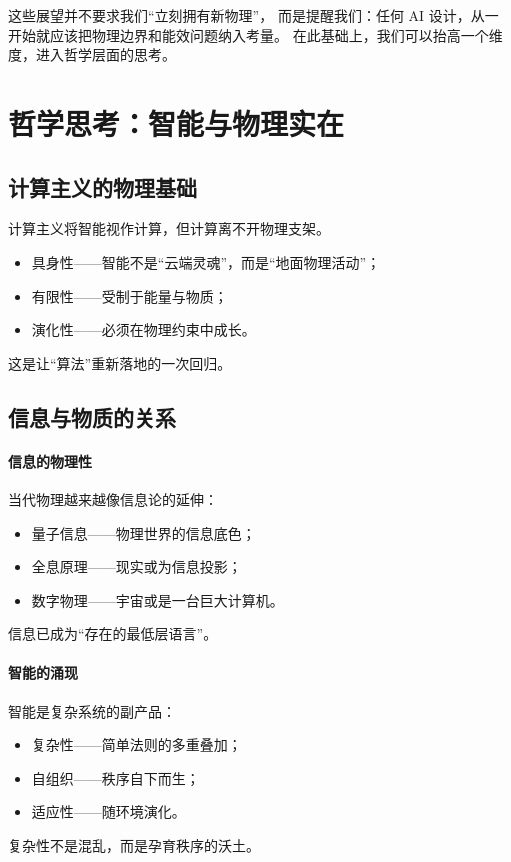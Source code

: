 这些展望并不要求我们“立刻拥有新物理”，  
而是提醒我们：任何 AI 设计，从一开始就应该把物理边界和能效问题纳入考量。  
在此基础上，我们可以抬高一个维度，进入哲学层面的思考。

\section{哲学思考：智能与物理实在}

\subsection{计算主义的物理基础}

计算主义将智能视作计算，但计算离不开物理支架。  
\begin{itemize}
\item 具身性——智能不是“云端灵魂”，而是“地面物理活动”；
\item 有限性——受制于能量与物质；
\item 演化性——必须在物理约束中成长。
\end{itemize}
这是让“算法”重新落地的一次回归。

\subsection{信息与物质的关系}

\paragraph{信息的物理性}
当代物理越来越像信息论的延伸：
\begin{itemize}
\item 量子信息——物理世界的信息底色；
\item 全息原理——现实或为信息投影；
\item 数字物理——宇宙或是一台巨大计算机。
\end{itemize}
信息已成为“存在的最低层语言”。

\paragraph{智能的涌现}
智能是复杂系统的副产品：
\begin{itemize}
\item 复杂性——简单法则的多重叠加；
\item 自组织——秩序自下而生；
\item 适应性——随环境演化。
\end{itemize}
复杂性不是混乱，而是孕育秩序的沃土。

